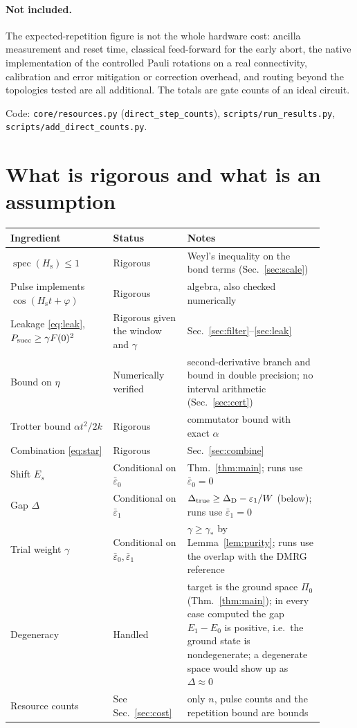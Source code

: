 \documentclass[11pt]{article}
\theoremstyle{definition}
\newcommand{\Hs}{H_{\mathrm s}}
\newcommand{\code}[1]{\texttt{#1}}
\begin{document}
\paragraph{Not included.} The expected-repetition figure is not the whole hardware cost: ancilla measurement and reset time, classical feed-forward
for the early abort, the native implementation of the controlled Pauli rotations on a real connectivity, calibration and error mitigation or
correction overhead, and routing beyond the topologies tested are all additional. The totals are gate counts of an ideal circuit.

Code: \code{core/resources.py} (\code{direct\_step\_counts}), \code{scripts/run\_results.py}, \code{scripts/add\_direct\_counts.py}.

\section{What is rigorous and what is an assumption}\label{sec:status}
\begin{center}
\small
\begin{tabular}{@{}p{0.30\linewidth}p{0.20\linewidth}p{0.40\linewidth}@{}}
\toprule
Ingredient & Status & Notes\\
\midrule
$\operatorname{spec}(\Hs)\le1$ & Rigorous & Weyl's inequality on the bond terms (Sec.~\ref{sec:scale})\\
Pulse implements $\cos(\Hs t+\varphi)$ & Rigorous & algebra, also checked numerically\\
Leakage \eqref{eq:leak}, $P_{\rm succ}\ge\gamma F(0)^2$ & Rigorous given the window and $\gamma$ & Sec.~\ref{sec:filter}--\ref{sec:leak}\\
Bound on $\eta$ & Numerically verified & second-derivative branch and bound in double precision; no interval arithmetic (Sec.~\ref{sec:cert})\\
Trotter bound $\alpha t^2/2k$ & Rigorous & commutator bound with exact $\alpha$\\
Combination \eqref{eq:star} & Rigorous & Sec.~\ref{sec:combine}\\
Shift $E_s$ & Conditional on $\bar\varepsilon_0$ & Thm.~\ref{thm:main}; runs use $\bar\varepsilon_0=0$\\
Gap $\Delta$ & Conditional on $\bar\varepsilon_1$ & $\Delta_{\rm true}\ge\Delta_{\rm D}-\varepsilon_1/W$ (below); runs use $\bar\varepsilon_1=0$\\
Trial weight $\gamma$ & Conditional on $\bar\varepsilon_0,\bar\varepsilon_1$ & $\gamma\ge\gamma_*$ by Lemma~\ref{lem:purity}; runs use the overlap with the DMRG reference\\
Degeneracy & Handled & target is the ground space $\Pi_0$ (Thm.~\ref{thm:main}); in every case computed the gap $E_1-E_0$ is positive, i.e.\ the ground state is nondegenerate; a degenerate space would show up as $\Delta\approx0$\\
Resource counts & See Sec.~\ref{sec:cost} & only $n$, pulse counts and the repetition bound are bounds\\
\bottomrule
\end{tabular}
\end{center}
\end{document}
